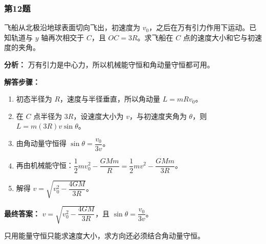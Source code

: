 \documentclass[12pt,a4paper]{ctexart}
\begin{document}
\subsubsection*{第12题}
\begin{tcolorbox}[colback=gray!2!white,colframe=black!60,title={题目}]
飞船从北极沿地球表面切向飞出，初速度为 \(v_0\)，之后在万有引力作用下运动。已知轨道与 \(y\) 轴再次相交于 \(C\)，且 \(OC=3R\)。求飞船在 \(C\) 点的速度大小和它与初速度的夹角。\par
\end{tcolorbox}
\begin{tcolorbox}[colback=blue!2!white,colframe=blue!55!black,title={完整答案}]
\textbf{分析：}
万有引力是中心力，所以机械能守恒和角动量守恒都可用。\par
\textbf{解答步骤：}
\begin{enumerate}
\item 初态半径为 \(R\)，速度与半径垂直，所以角动量 \(L=mRv_0\)。
\item 在 \(C\) 点半径为 \(3R\)，设速度大小为 \(v\)，与初速度夹角为 \(\theta\)，则 \(L=m(3R)v\sin\theta\)。
\item 由角动量守恒得 \(\sin\theta=\dfrac{v_0}{3v}\)。
\item 再由机械能守恒：\(\dfrac12 mv_0^2-\dfrac{GMm}{R}=\dfrac12 mv^2-\dfrac{GMm}{3R}\)。
\item 解得 \(v=\sqrt{v_0^2-\dfrac{4GM}{3R}}\)。
\end{enumerate}
\textbf{最终答案：}
\(v=\sqrt{v_0^2-\dfrac{4GM}{3R}}\)，且 \(\sin\theta=\dfrac{v_0}{3v}\)。\par
\end{tcolorbox}
\begin{tcolorbox}[colback=red!2!white,colframe=red!55!black,title={易错点}]
只用能量守恒只能求速度大小，求方向还必须结合角动量守恒。\par
\end{tcolorbox}
\end{document}
